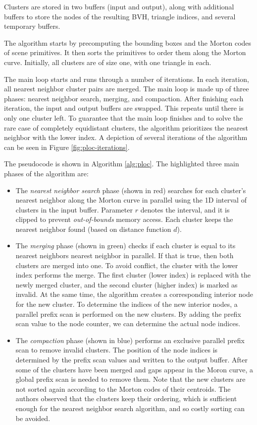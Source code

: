 Clusters are stored in two buffers (input and output), along with additional buffers to store the nodes of the resulting BVH, triangle indices, and several temporary buffers.

The algorithm starts by precomputing the bounding boxes and the Morton codes of scene primitives. It then sorts the primitives to order them along the Morton curve. Initially, all clusters are of size one, with one triangle in each.

The main loop starts and runs through a number of iterations. In each iteration, all nearest neighbor cluster pairs are merged. The main loop is made up of three phases: nearest neighbor search, merging, and compaction. After finishing each iteration, the input and output buffers are swapped. This repeats until there is only one cluster left. To guarantee that the main loop finishes and to solve the rare case of completely equidistant clusters, the algorithm prioritizes the nearest neighbor with the lower index. A depiction of several iterations of the algorithm can be seen in Figure \ref{fig:ploc-iterations}. \cite{MB17}

The pseudocode is shown in Algorithm \ref{alg:ploc}. The highlighted three main phases of the algorithm are:

\begin{itemize}
    \item The \textit{nearest neighbor search} phase (shown in {\color{nncolor} red}) searches for each cluster's nearest neighbor along the Morton curve in parallel using the 1D interval of clusters in the input buffer. Parameter $r$ denotes the interval, and it is clipped to prevent \textit{out-of-bounds} memory access. Each cluster keeps the nearest neighbor found (based on distance function $d$).
    \item The \textit{merging} phase (shown in {\color{mergecolor} green}) checks if each cluster is equal to its nearest neighbors nearest neighbor in parallel. If that is true, then both clusters are merged into one. To avoid conflict, the cluster with the lower index performs the merge. The first cluster (lower index) is replaced with the newly merged cluster, and the second cluster (higher index) is marked as invalid. At the same time, the algorithm creates a corresponding interior node for the new cluster. To determine the indices of the new interior nodes, a parallel prefix scan is performed on the new clusters. By adding the prefix scan value to the node counter, we can determine the actual node indices.
    \item The \textit{compaction} phase (shown in {\color{compactcolor} blue}) performs an exclusive parallel prefix scan to remove invalid clusters. The position of the node indices is determined by the prefix scan values and written to the output buffer. After some of the clusters have been merged and gaps appear in the Moron curve, a global prefix scan is needed to remove them. Note that the new clusters are not sorted again according to the Morton codes of their centroids. The authors observed that the clusters keep their ordering, which is sufficient enough for the nearest neighbor search algorithm, and so costly sorting can be avoided.
\end{itemize} 

